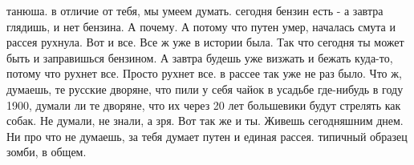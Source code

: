 танюша. в отличие от тебя, мы умеем думать. сегодня бензин есть - а завтра
глядишь, и нет бензина. А почему. А потому что путен умер, началась смута и
рассея рухнула. Вот и все. Все ж уже в истории была. Так что сегодня ты может
быть и заправишься бензином. А завтра будешь уже визжать и бежать куда-то,
потому что рухнет все. Просто рухнет все. в рассее так уже не раз было. Что ж,
думаешь, те русские дворяне, что пили у себя чайок в усадьбе где-нибудь в году
1900, думали ли те дворяне, что их через 20 лет большевики будут стрелять как
собак. Не думали, не знали, а зря. Вот так же и ты. Живешь сегодняшним днем. Ни
про что не думаешь, за тебя думает путен и единая рассея. типичный образец
зомби, в общем.
